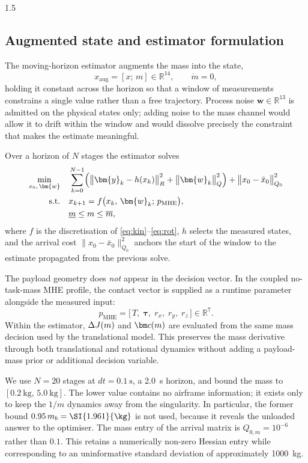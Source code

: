 \begin{spacing}{1.5}
\subsection{Augmented state and estimator formulation}\label{sec:model:mheform}

The moving-horizon estimator augments the mass into the state,
\begin{equation}
x_{\mathrm{aug}} = [x;\, m] \in \mathbb{R}^{14},
\qquad \dot m = 0,
\label{eq:xaug}
\end{equation}
holding it constant across the horizon so that a window of measurements
constrains a single value rather than a free trajectory. Process noise
$\bm{w} \in \mathbb{R}^{13}$ is admitted on the physical states only;
adding noise to the mass channel would allow it to drift within the
window and would dissolve precisely the constraint that makes the
estimate meaningful.

Over a horizon of $N$ stages the estimator solves
\begin{align}
\min_{x_0,\, \bm{w}} \quad
& \sum_{k=0}^{N-1} \Bigl( \bigl\| \bm{y}_k - h(x_k) \bigr\|^2_{R}
+ \bigl\| \bm{w}_k \bigr\|^2_{Q} \Bigr)
+ \bigl\| x_0 - \bar{x}_0 \bigr\|^2_{Q_0} \nonumber \\
\mathrm{s.t.} \quad
& x_{k+1} = f\bigl( x_k,\, \bm{w}_k;\, p_{\mathrm{MHE}} \bigr), \nonumber \\
& \underline{m} \le m \le \overline{m},
\label{eq:mhe}
\end{align}
where $f$ is the discretisation of \eqref{eq:kin}--\eqref{eq:rot},
$h$ selects the measured states, and the arrival cost
$\| x_0 - \bar{x}_0 \|^2_{Q_0}$ anchors the start of the window to the
estimate propagated from the previous solve.

The payload geometry does \emph{not} appear in the decision vector. In
the coupled no-task-mass MHE profile, the contact vector is supplied as a
runtime parameter alongside the measured input:
\begin{equation}
p_{\mathrm{MHE}} = \bigl[\, T,\; \bm{\tau},\; r_x,\; r_y,\; r_z \,\bigr] \in \mathbb{R}^{7}.
\label{eq:pmhe}
\end{equation}
Within the estimator, $\Delta J(m)$ and $\cvec(m)$ are evaluated from the
same mass decision used by the translational model. This preserves the
mass derivative through both translational and rotational dynamics
without adding a payload-mass prior or additional decision variable.

We use $N = 20$ stages at $dt = \SI{0.1}{\second}$, a \SI{2.0}{\second}
horizon, and bound the mass to
$[\SI{0.2}{\kg},\, \SI{5.0}{\kg}]$. The lower value contains no
airframe information; it exists only to keep the $1/m$ dynamics away from
the singularity. In particular, the former bound
$0.95\,\mb=\SI{1.961}{\kg}$ is not used, because it reveals the
unloaded answer to the optimiser. The mass entry of the arrival matrix is
$Q_{0,m}=10^{-6}$ rather than $0.1$. This retains a numerically non-zero
Hessian entry while corresponding to an uninformative standard deviation
of approximately \SI{1000}{\kg}.


\end{spacing}
